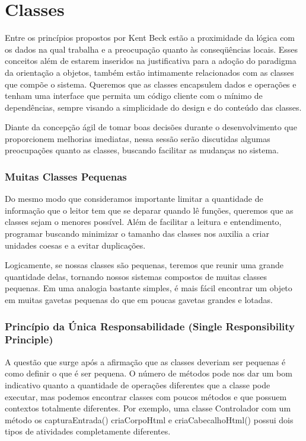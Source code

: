 \section{Classes}
\label{sec:classes}

Entre os princípios propostos por Kent Beck estão a proximidade da lógica com os dados na qual trabalha e a preocupação quanto às conseqüências locais. Esses conceitos além de estarem inseridos na justificativa para a adoção do paradigma da orientação a objetos, também estão intimamente relacionados com as classes que compõe o sistema. Queremos que as classes encapsulem dados e operações e tenham uma interface que permita um código cliente com o mínimo de dependências, sempre visando a simplicidade do design e do conteúdo das classes.
	
Diante da concepção ágil de tomar boas decisões durante o desenvolvimento que proporcionem melhorias imediatas, nessa sessão serão discutidas algumas preocupações quanto as classes, buscando facilitar as mudanças no sistema.

\subsubsection{Muitas Classes Pequenas}
Do mesmo modo que consideramos importante limitar a quantidade de informação que o leitor tem que se deparar quando lê funções, queremos que as classes sejam o menores possível. Além de facilitar a leitura e entendimento, programar buscando minimizar o tamanho das classes nos auxilia a criar unidades coesas e a evitar duplicações. 
	
Logicamente, se nossas classes são pequenas, teremos que reunir uma grande quantidade delas, tornando nossos sistemas compostos de muitas classes pequenas. Em uma analogia bastante simples, é mais fácil encontrar um objeto em muitas gavetas pequenas do que em poucas gavetas grandes e lotadas.

\subsubsection{Princípio da Única Responsabilidade (Single Responsibility Principle)}
A questão que surge após a afirmação que as classes deveriam ser pequenas é como definir o que é ser pequena. O número de métodos pode nos dar um bom indicativo quanto a quantidade de operações diferentes que a classe pode executar, mas podemos encontrar classes com poucos métodos e que possuem contextos totalmente diferentes. Por exemplo, uma classe Controlador com um método os capturaEntrada() criaCorpoHtml e criaCabecalhoHtml() possui dois tipos de atividades completamente diferentes.
	
